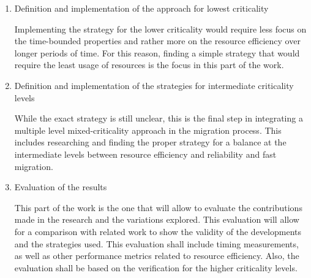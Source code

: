 \begin{enumerate}
	\item	Definition and implementation of the approach for lowest criticality
	
	Implementing the strategy for the lower criticality would require less focus on the time-bounded properties and rather more on the resource efficiency over longer periods of time. For this reason, finding a simple strategy that would require the least usage of resources is the focus in this part of the work.

	\item	Definition and implementation of the strategies for intermediate criticality levels
	
	While the exact strategy is still unclear, this is the final step in integrating a multiple level mixed-criticality approach in the migration process. This includes researching and finding the proper strategy for a balance at the intermediate levels between resource efficiency and reliability and fast migration.
	
	\item	Evaluation of the results
	
	This part of the work is the one that will allow to evaluate the contributions made in the research and the variations explored. This evaluation will allow for a comparison with related work to show the validity of the developments and the strategies used. This evaluation shall include timing measurements, as well as other performance metrics related to resource efficiency. Also, the evaluation shall be based on the verification for the higher criticality levels.
\end{enumerate}

